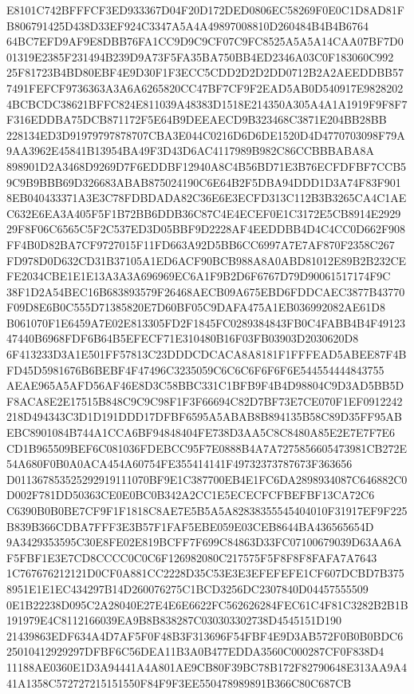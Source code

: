 \documentclass[UTF8,fontset=fandol,zihao=-4,a4paper]{ctexart}
\begin{document}
{{E8101C742BFFFCF3ED933367D04F20D172DED0806EC58269F0E0C1D8AD81FB806791425D438D33EF924C3347A5A4A49897008810D260484B4B4B6764
64BC7EFD9AF9E8DBB76FA1CC9D9C9CF07C9FC8525A5A5A14CAA07BF7D001319E2385F231494B239D9A73F5FA35BA750BB4ED2346A03C0F183060C992
25F81723B4BD80EBF4E9D30F1F3ECC5CDD2D2D2DD0712B2A2AEEDDBB577491FEFCF9736363A3A6A6265820CC47BF7CF9F2EAD5AB0D540917E9828202
4BCBCDC38621BFFC824E811039A48383D1518E214350A305A4A1A1919F9F8F7F316EDDBA75DCB871172F5E64B9DEEAECD9B323468C3871E204BB28BB
228134ED3D91979797878707CBA3E044C0216D6D6DE1520D4D4770703098F79A9AA3962E45841B13954BA49F3D43D6AC4117989B982C86CCBBBABA8A
898901D2A3468D9269D7F6EDDBF12940A8C4B56BD71E3B76ECFDFBF7CCB59C9B9BBB69D326683ABAB875024190C6E64B2F5DBA94DDD1D3A74F83F901
8EB040433371A3E3C78FDBDADA82C36E6E3ECFD313C112B3B3265CA4C1AEC632E6EA3A405F5F1B72BB6DDB36C87C4E4ECEF0E1C3172E5CB8914E2929
29F8F06C6565C5F2C537ED3D05BBF9D2228AF4EEDDBB4D4C4CC0D662F908FF4B0D82BA7CF9727015F11FD663A92D5BB6CC6997A7E7AF870F2358C267
FD978D0D632CD31B37105A1ED6ACF90BCB988A8A0ABD81012E89B2B232CEFE2034CBE1E1E13A3A3A696969EC6A1F9B2D6F6767D79D90061517174F9C
38F1D2A54BEC16B683893579F26468AECB09A675EBD6FDDCAEC3877B43770F09D8E6B0C555D71385820E7D60BF05C9DAFA475A1EB036992082AE61D8
B061070F1E6459A7E02E813305FD2F1845FC0289384843FB0C4FABB4B4F4912347440B6968FDF6B64B5EFECF71E310480B16F03FB03903D2030620D8
6F413233D3A1E501FF57813C23DDDCDCACA8A8181F1FFFEAD5ABEE87F4BFD45D5981676B6BEBF4F47496C3235059C6C6C6F6F6F6E544554444843755
AEAE965A5AFD56AF46E8D3C58BBC331C1BFB9F4B4D98804C9D3AD5BB5DF8ACA8E2E17515B848C9C9C98F1F3F66694C82D7BF73E7CE070F1EF0912242
218D494343C3D1D191DDD17DFBF6595A5ABAB8B894135B58C89D35FF95ABEBC8901084B744A1CCA6BF94848404FE738D3AA5C8C8480A85E2E7E7F7E6
CD1B965509BEF6C081036FDEBCC95F7E0888B4A7A7275856605473981CB272E54A680F0B0A0ACA454A60754FE355414141F49732373787673F363656
D011367853525292919111070BF9E1C387700EB4E1FC6DA2898934087C646882C0D002F781DD50363CE0E0BC0B342A2CC1E5ECECFCFBEFBF13CA72C6
C6390B0B0BE7CF9F1F1818C8AE7E5B5A5A82838355545404010F31917EF9F225B839B366CDBA7FFF3E3B57F1FAF5EBE059E03CEB8644BA436565654D
9A3429353595C30E8FE02E819BCFF7F699C84863D33FC07100679039D63AA6AF5FBF1E3E7CD8CCCC0C0C6F126982080C217575F5F8F8F8FAFA7A7643
1C767676212121D0CF0A881CC2228D35C53E3E3EFEFEFE1CF607DCBD7B3758951E1E1EC434297B14D260076275C1BCD3256DC2307840D04457555509
0E1B22238D095C2A28040E27E4E6E6622FC562626284FEC61C4F81C3282B2B1B191979E4C8112166039EA9B8B838287C030303302738D4545151D190
21439863EDF634A4D7AF5F0F48B3F313696F54FBF4E9D3AB572F0B0B0BDC625010412929297DFBF6C56DEA11B3A0B477EDDA3560C000287CF0F838D4
11188AE0360E1D3A94441A4A801AE9CB80F39BC78B172F82790648E313AA9A441A1358C572727215151550F84F9F3EE550478989891B366C80C687CB
}}
\end{document}
